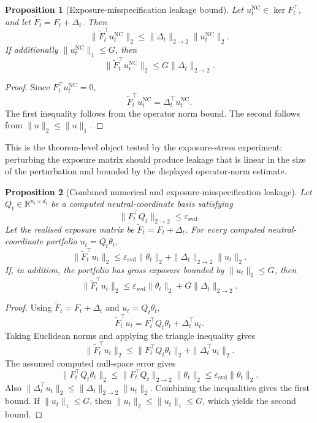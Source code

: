 \documentclass[11pt]{article}
\newtheorem{proposition}{Proposition}
\newcommand{\R}{\mathbb{R}}
\begin{document}
\begin{proposition}[Exposure-misspecification leakage bound]
\label{prop:misspecification-bound}
Let $u_t^{\mathrm{NC}}\in\ker F_t^\top$, and let $\widetilde F_t = F_t+\Delta_t$.  Then
\begin{equation}
        \|\widetilde F_t^\top u_t^{\mathrm{NC}}\|_2
        \le \|\Delta_t\|_{2\to2}\|u_t^{\mathrm{NC}}\|_2.
\end{equation}
If additionally $\|u_t^{\mathrm{NC}}\|_1\le G$, then
\begin{equation}
        \|\widetilde F_t^\top u_t^{\mathrm{NC}}\|_2 \le G\|\Delta_t\|_{2\to2}.
\end{equation}
\end{proposition}

\begin{proof}
Since $F_t^\top u_t^{\mathrm{NC}} = 0$,
\[
        \widetilde F_t^\top u_t^{\mathrm{NC}}=\Delta_t^\top u_t^{\mathrm{NC}}.
\]
The first inequality follows from the operator norm bound.  The second follows from
$\|u\|_2\le\|u\|_1$.
\end{proof}
This is the theorem-level object tested by the exposure-stress experiment: perturbing the exposure
matrix should produce leakage that is linear in the size of the perturbation and bounded by the displayed
operator-norm estimate.

\begin{proposition}[Combined numerical and exposure-misspecification leakage]
\label{prop:combined-leakage-bound}
Let $Q_t\in\R^{n_t\times d_t}$ be a computed neutral-coordinate basis satisfying
\[
        \|F_t^\top Q_t\|_{2\to 2}\le \varepsilon_{\mathrm{svd}}.
\]
Let the realised exposure matrix be $\widetilde F_t = F_t+\Delta_t$.  For every computed neutral-coordinate
portfolio $u_t=Q_t\theta_t$,
\begin{equation}
        \|\widetilde F_t^\top u_t\|_2
        \le \varepsilon_{\mathrm{svd}}\|\theta_t\|_2+\|\Delta_t\|_{2\to 2}\|u_t\|_2.
\end{equation}
If, in addition, the portfolio has gross exposure bounded by $\|u_t\|_1\le G$, then
\begin{equation}
        \|\widetilde F_t^\top u_t\|_2
        \le \varepsilon_{\mathrm{svd}}\|\theta_t\|_2+G\|\Delta_t\|_{2\to 2}.
\end{equation}
\end{proposition}

\begin{proof}
Using $\widetilde F_t = F_t+\Delta_t$ and $u_t=Q_t\theta_t$,
\[
        \widetilde F_t^\top u_t=F_t^\top Q_t\theta_t+\Delta_t^\top u_t.
\]
Taking Euclidean norms and applying the triangle inequality gives
\[
        \|\widetilde F_t^\top u_t\|_2
        \le \|F_t^\top Q_t\theta_t\|_2+\|\Delta_t^\top u_t\|_2.
\]
The assumed computed null-space error gives
\[
        \|F_t^\top Q_t\theta_t\|_2
        \le \|F_t^\top Q_t\|_{2\to2}\|\theta_t\|_2
        \le \varepsilon_{\mathrm{svd}}\|\theta_t\|_2.
\]
Also $\|\Delta_t^\top u_t\|_2\le\|\Delta_t\|_{2\to2}\|u_t\|_2$.  Combining the inequalities gives
the first bound.  If $\|u_t\|_1\le G$, then $\|u_t\|_2\le\|u_t\|_1\le G$, which yields the second
bound.
\end{proof}
\end{document}
